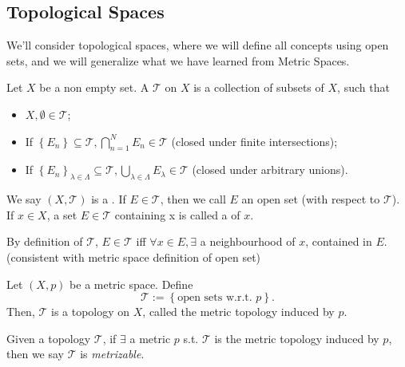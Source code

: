 \subsection{Topological Spaces}
We'll consider topological spaces, where we will define all concepts using open sets,
and we will generalize what we have learned from Metric Spaces.
\begin{defn}
    Let $X$ be a non empty set. A  $\mathcal{T}$ on $X$ is a collection of subsets of $X$,
    such that
    \begin{itemize}
        \item $X, \emptyset \in \mathcal{T}$;
        \item If $\left\{ E_n \right\} \subseteq \mathcal{T}, \bigcap_{n=1}^{N} E_n \in \mathcal{T}$
        (closed under finite intersections);
        \item If $\left\{ E_n \right\}_{\lambda \in \Lambda} \subseteq \mathcal{T}, 
        \bigcup_{\lambda \in \Lambda} E_\lambda \in \mathcal{T}$ (closed under arbitrary unions).
    \end{itemize}
    We say $(X, \mathcal{T})$ is a .  
    \newline If $E \in \mathcal{T}$, then we call $E$ an open set (with respect to $\mathcal{T}$).  
    \newline If $x \in X$, a set $E \in \mathcal{T}$ containing x is called a 
     of $x$.

\end{defn}

\begin{rem}
    By definition of $\mathcal{T}$, $E \in \mathcal{T}$ iff $\forall x \in E, \exists$ a neighbourhood 
    of $x$, contained in $E$. (consistent with metric space definition of open set)     
\end{rem} 

\begin{exmp}
    Let $(X, p)$ be a metric space. Define 
    \[
        \mathcal{T} := \left\{ \text{open sets w.r.t. } p  \right\} .
    \]
    Then, $\mathcal{T}$ is a topology on $X$, called the metric topology induced by $p$.

    Given a topology $\mathcal{T}$, if $\exists $ a metric $p$ s.t. $\mathcal{T}$ is the metric topology 
    induced by $p$, then we say $\mathcal{T}$ is \textit{metrizable}.  
    
\end{exmp}

